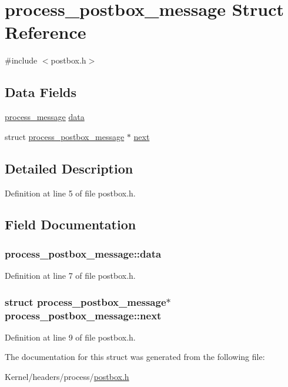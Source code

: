 \hypertarget{structprocess__postbox__message}{
\section{process\_\-postbox\_\-message Struct Reference}
\label{structprocess__postbox__message}
}


{\ttfamily \#include $<$postbox.h$>$}

\subsection*{Data Fields}
\begin{DoxyCompactItemize}
\item 
\hyperlink{structprocess__message}{process\_\-message} \hyperlink{structprocess__postbox__message_a70bc32e1d3df2366a02f4c86411a0312}{data}
\item 
struct \hyperlink{structprocess__postbox__message}{process\_\-postbox\_\-message} $\ast$ \hyperlink{structprocess__postbox__message_a3919f8f5402c2dc8df044b35d748fc6c}{next}
\end{DoxyCompactItemize}


\subsection{Detailed Description}


Definition at line 5 of file postbox.h.



\subsection{Field Documentation}
\hypertarget{structprocess__postbox__message_a70bc32e1d3df2366a02f4c86411a0312}{
\subsubsection[{data}]{ {\bf process\_\-postbox\_\-message::data}}}
\label{structprocess__postbox__message_a70bc32e1d3df2366a02f4c86411a0312}


Definition at line 7 of file postbox.h.

\hypertarget{structprocess__postbox__message_a3919f8f5402c2dc8df044b35d748fc6c}{
\subsubsection[{next}]{\setlength{\rightskip}{0pt plus 5cm}struct {\bf process\_\-postbox\_\-message}$\ast$ {\bf process\_\-postbox\_\-message::next}}}
\label{structprocess__postbox__message_a3919f8f5402c2dc8df044b35d748fc6c}


Definition at line 9 of file postbox.h.



The documentation for this struct was generated from the following file:\begin{DoxyCompactItemize}
\item 
Kernel/headers/process/\hyperlink{postbox_8h}{postbox.h}\end{DoxyCompactItemize}
